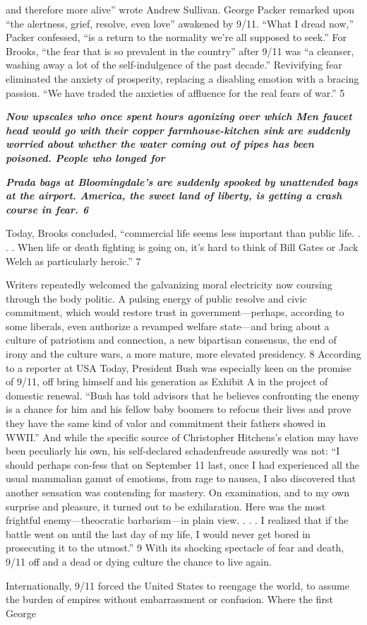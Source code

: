 and therefore more alive” wrote Andrew Sullivan. George Packer remarked upon “the alertness, grief, resolve, even love” awakened by 9/11. “What I dread now,” Packer confessed, “is a return to the normality we’re all supposed to seek.” For Brooks, “the fear that is so prevalent in the country” after 9/11 was “a cleanser, washing away a lot of the self-indulgence of the past decade.” Revivifying fear eliminated the anxiety of prosperity, replacing a disabling emotion with a bracing passion. “We have traded the anxieties of affluence for the real fears of war.” 5{\par} {\textbf{\textit{Now upscales who once spent hours agonizing over which Men faucet head would go with their copper farmhouse-kitchen sink are suddenly worried about whether the water coming out of pipes has been poisoned. People who longed for} } }{\par} {\par} {\textbf{\textit{Prada bags at Bloomingdale's are suddenly spooked by unattended bags at the airport. America, the sweet land of liberty, is getting a crash course in fear. {\color{blue} 6 } } } }{\par} Today, Brooks concluded, “commercial life seems less important than public life. . . . When life or death fighting is going on, it’s hard to think of Bill Gates or Jack Welch as particularly heroic.” {\color{blue} 7 } {\par} Writers repeatedly welcomed the galvanizing moral electricity now coursing through the body politic. A pulsing energy of public resolve and civic commitment, which would restore trust in government—perhaps, according to some liberals, even authorize a revamped welfare state—and bring about a culture of patriotism and connection, a new bipartisan consensus, the end of irony and the culture wars, a more mature, more elevated presidency. {\color{blue} 8 } According to a reporter at USA Today, President Bush was especially keen on the promise of 9/11, off bring himself and his generation as Exhibit A in the project of domestic renewal. “Bush has told advisors that he believes confronting the enemy is a chance for him and his fellow baby boomers to refocus their lives and prove they have the same kind of valor and commitment their fathers showed in WWII.” And while the specific source of Christopher Hitchens’s elation may have been peculiarly his own, his self-declared schadenfreude assuredly was not: “I should perhaps con-fess that on September {\color{blue} 11 } last, once I had experienced all the usual mammalian gamut of emotions, from rage to nausea, I also discovered that another sensation was contending for mastery. On examination, and to my own surprise and pleasure, it turned out to be exhilaration. Here was the most frightful enemy—theocratic barbarism—in plain view. . . . I realized that if the battle went on until the last day of my life, I would never get bored in prosecuting it to the utmost.” {\color{blue} 9 } With its shocking spectacle of fear and death, 9/11 off and a dead or dying culture the chance to live again.{\par} Internationally, 9/11 forced the United States to reengage the world, to assume the burden of empires without embarrassment or confusion. Where the first George 